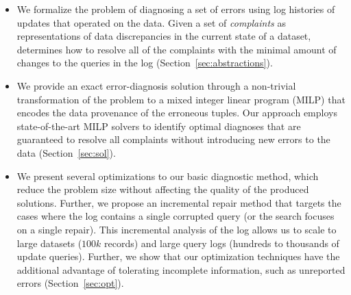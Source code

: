 


\begin{itemize}[leftmargin=*, topsep=0mm, itemsep=0mm]      
    \item We formalize the problem of diagnosing a set of errors using log
    histories of updates that operated on the data. Given a set of 
    \emph{complaints} as representations of data discrepancies in the current
    state of a dataset, \sys determines how to resolve all of the complaints with the minimal amount of changes to the queries in the log (Section~\ref{sec:abstractions}).
      
    \item We provide an exact error-diagnosis solution through a non-trivial
    transformation of the problem to a mixed integer linear program (MILP) that
    encodes the data provenance of the erroneous tuples. Our approach employs state-of-the-art MILP solvers to identify
    optimal diagnoses that are guaranteed to resolve all complaints without introducing new errors to the data
    (Section~\ref{sec:sol}).
    
    \item We present several optimizations to our basic diagnostic
    method, which reduce the problem size without affecting the
    quality of the produced solutions. Further, we propose an
    incremental repair method that targets the cases where the log
    contains a single corrupted query (or the search focuses on a
    single repair). This incremental analysis of the log allows us to
    scale to large datasets ($100k$ records) and large query logs (hundreds to thousands of update queries). Further, we
    show that our optimization techniques have the additional
    advantage of tolerating incomplete information, such as unreported
    errors (Section~\ref{sec:opt}). 

    
    

\end{itemize}
